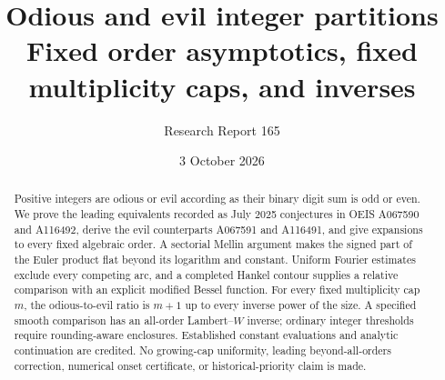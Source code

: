 \documentclass[11pt,letterpaper]{article}
\title{Odious and evil integer partitions\\[5pt]\large Fixed order asymptotics, fixed multiplicity caps, and inverses}
\author{Research Report 165}
\date{3 October 2026}
\theoremstyle{remark}\newtheorem{remark}[theorem]{Remark}
\begin{document}
\maketitle
\begin{abstract}
Positive integers are odious or evil according as their binary digit sum is odd or even. We prove the leading equivalents recorded as July 2025 conjectures in OEIS A067590 and A116492, derive the evil counterparts A067591 and A116491, and give expansions to every fixed algebraic order. A sectorial Mellin argument makes the signed part of the Euler product flat beyond its logarithm and constant. Uniform Fourier estimates exclude every competing arc, and a completed Hankel contour supplies a relative comparison with an explicit modified Bessel function. For every fixed multiplicity cap $m$, the odious-to-evil ratio is $m+1$ up to every inverse power of the size. A specified smooth comparison has an all-order Lambert--$W$ inverse; ordinary integer thresholds require rounding-aware enclosures. Established constant evaluations and analytic continuation are credited. No growing-cap uniformity, leading beyond-all-orders correction, numerical onset certificate, or historical-priority claim is made.
\end{abstract}
\end{document}
